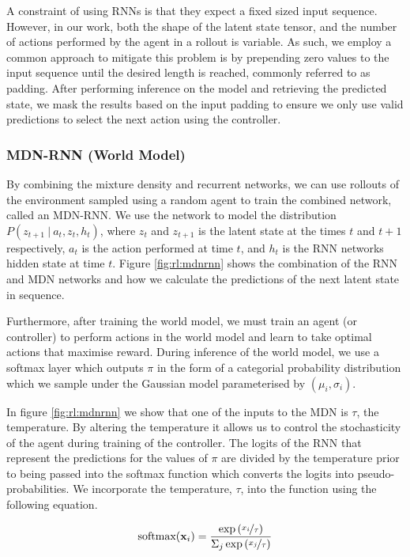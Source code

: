 A constraint of using RNNs is that they expect a fixed sized input sequence. However, in our work, both the shape of the latent state tensor, and the number of actions performed by the agent in a rollout is variable. As such, we employ a common approach to mitigate this problem is by prepending zero values to the input sequence until the desired length is reached, commonly referred to as padding. After performing inference on the model and retrieving the predicted state, we mask the results based on the input padding to ensure we only use valid predictions to select the next action using the controller.

\subsubsection{MDN-RNN (World Model)}

By combining the mixture density and recurrent networks, we can use rollouts of the environment sampled using a random agent to train the combined network, called an MDN-RNN. We use the network to model the distribution $P(z_{t+1}~|~a_t, z_t, h_t)$, where $z_t$ and $z_{t+1}$ is the latent state at the times $t$ and $t+1$ respectively, $a_t$ is the action performed at time $t$, and $h_t$ is the RNN networks hidden state at time $t$. Figure \ref{fig:rl:mdnrnn} shows the combination of the RNN and MDN networks and how we calculate the predictions of the next latent state in sequence.

Furthermore, after training the world model, we must train an agent (or controller) to perform actions in the world model and learn to take optimal actions that maximise reward. During inference of the world model, we use a softmax layer which outputs $\pi$ in the form of a categorial probability distribution which we sample under the Gaussian model parameterised by $(\mu_i, \sigma_i)$.

In figure \ref{fig:rl:mdnrnn} we show that one of the inputs to the MDN is $\tau$, the temperature. By altering the temperature it allows us to control the stochasticity of the agent during training of the controller. The logits of the RNN that represent the predictions for the values of $\pi$ are divided by the temperature prior to being passed into the softmax function which converts the logits into pseudo-probabilities. We incorporate the temperature, $\tau$, into the function using the following equation.

$$
\text{softmax}(\mathbf{x}_i) = \frac{\exp\left( \nicefrac{x_i}{\tau} \right) }{\Sigma_j \exp \left( \nicefrac{x_j}{\tau} \right) }
$$

